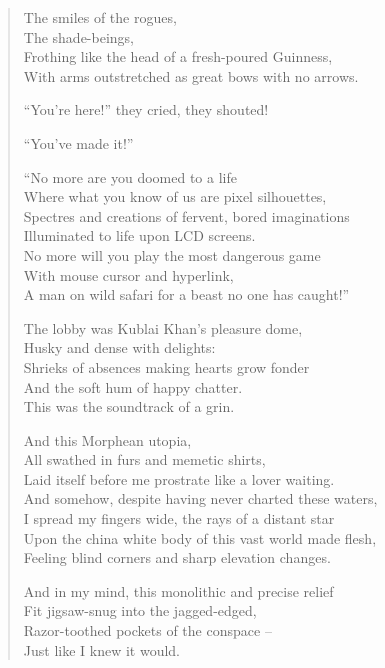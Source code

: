 \begin{verse}
  The smiles of the rogues,\\
  The shade-beings,\\
  Frothing like the head of a fresh-poured Guinness,\\
  With arms outstretched as great bows with no arrows.\par

  ``You're here!'' they cried, they shouted!\par

  ``You've made it!''\par

  ``No more are you doomed to a life\\
  Where what you know of us are pixel silhouettes,\\
  Spectres and creations of fervent, bored imaginations\\
  Illuminated to life upon LCD screens.\\
  No more will you play the most dangerous game\\
  With mouse cursor and hyperlink,\\
  A man on wild safari for a beast no one has caught!''\par

  The lobby was Kublai Khan's pleasure dome,\\
  Husky and dense with delights:\\
  Shrieks of absences making hearts grow fonder\\
  And the soft hum of happy chatter.\\
  This was the soundtrack of a grin.\par

  And this Morphean utopia,\\
  All swathed in furs and memetic shirts,\\
  Laid itself before me prostrate like a lover waiting.\\
  And somehow, despite having never charted these waters,\\
  I spread my fingers wide, the rays of a distant star\\
  Upon the china white body of this vast world made flesh,\\
  Feeling blind corners and sharp elevation changes.\par

  And in my mind, this monolithic and precise relief\\
  Fit jigsaw-snug into the jagged-edged,\\
  Razor-toothed pockets of the conspace --\\
  Just like I knew it would.\\


\end{verse}
